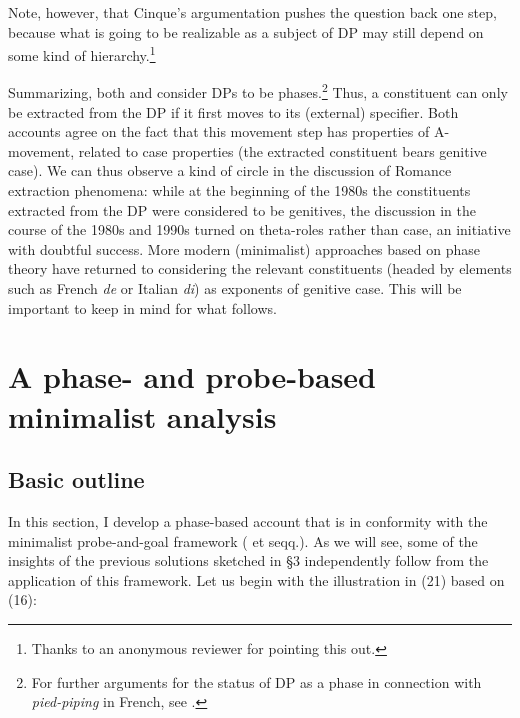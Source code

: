 \documentclass[output=paper]{langsci/langscibook}
\begin{document}
Note, however, that Cinque’s argumentation pushes the question back one step, because what is going to be realizable as a subject of DP may still depend on some kind of hierarchy.\footnote{Thanks to an anonymous reviewer for pointing this out.}

Summarizing, both \citet{Gutiérrez-Bravo2001} and \citet{Cinque2014} consider DPs to be phases.\footnote{For further arguments for the status of DP as a phase in connection with \textit{pied-piping} in French, see \citet{Heck2008}.} Thus, a constituent can only be extracted from the DP if it first moves to its (external) specifier. Both accounts agree on the fact that this movement step has properties of A-movement, related to case properties (the extracted constituent bears genitive case). We can thus observe a kind of circle in the discussion of Romance extraction phenomena: while at the beginning of the 1980s the constituents extracted from the DP were considered to be genitives, the discussion in the course of the 1980s and 1990s turned on theta-roles rather than case, an initiative with doubtful success. More modern (minimalist) approaches based on phase theory have returned to considering the relevant constituents (headed by elements such as French \textit{de} or Italian \textit{di}) as exponents of genitive case. This will be important to keep in mind for what follows.

\section{A phase- and probe-based minimalist analysis} %

\subsection{Basic outline}%

In this section, I develop a phase-based account that is in conformity with the minimalist probe-and-goal framework (\citealt{Chomsky2000} et seqq.). As we will see, some of the insights of the previous solutions sketched in §3 independently follow from the application of this framework. Let us begin with the illustration in (21) based on (16):
\end{document}
